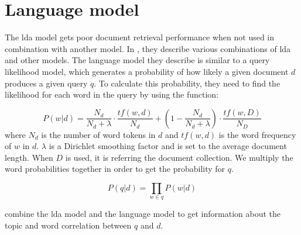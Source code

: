 \section{Language model}
The \gls{lda} model gets poor document retrieval performance when not used in combination with another model\cite{yang2009topic}.
In \cite{yang2009topic}, they describe various combinations of \gls{lda} and other models. 
The language model they describe is similar to a query likelihood model, which generates a probability of how likely a given document $d$ produces a given query $q$.
To calculate this probability, they need to find the likelihood for each word in the query by using the function:

$$ P(w|d) = \frac{N_d}{N_d + \lambda} \cdot \frac{tf(w,d)}{N_d} + (1 - \frac{N_d}{N_d + \lambda}) \cdot \frac{tf(w,D)}{N_D} $$
where $N_d$ is the number of word tokens in $d$ and $tf(w,d)$ is the word frequency of $w$ in $d$. $\lambda$ is a Dirichlet smoothing factor and is set to the average document length.
When $D$ is used, it is referring the document collection.
We multiply the word probabilities together in order to get the probability for $q$.

$$ P(q|d) = \prod_{w \in q} P(w|d) $$
 
\cite{yang2009topic} combine the \gls{lda} model and the language model to get information about the topic and word correlation between $q$ and $d$.
